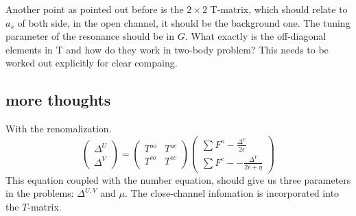 Another point as pointed out before is  the $2\times2$ T-matrix, which should relate to $a_s$ of both side, in the open channel, it should be the background one.  The tuning parameter of the resonance should be in $G$.  What exactly is the off-diagonal elements in T and how do they work in two-body problem?  This needs to be worked out explicitly for clear compaing.    
\subsection{more thoughts}
With the renomalization.  
\begin{equation}\label{eq:renomal1}
\begin{pmatrix}\Delta^U\\\Delta^V\end{pmatrix}=\begin{pmatrix}T^{oo}&T^{oc}\\T^{co}&T^{cc}\end{pmatrix}
\begin{pmatrix}\sum{F^o-\frac{\Delta^U}{2\epsilon}}\\\sum{F^c--\frac{\Delta^V}{2\epsilon+\eta}}\end{pmatrix}
\end{equation}
This equation coupled with the number equation, should give us three parameters in the problems: $\Delta^{U,V}$ and $\mu$.  The close-channel infomation is incorporated into the $T$-matrix. 